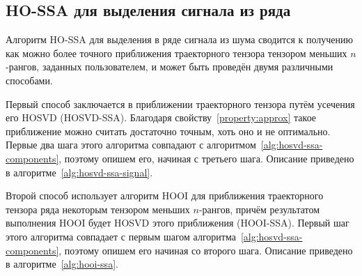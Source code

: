 \documentclass[specialist,
    substylefile = spbu.rtx,
    subf,href,colorlinks=true, 12pt]{disser}
\theoremstyle{plain}
\theoremstyle{definition}
\theoremstyle{remark}
\begin{document}
    \subsection{HO-SSA для выделения сигнала из ряда}\label{subsec:ho-ssa-signal}
    Алгоритм HO-SSA для выделения в ряде сигнала из шума сводится к получению
    как можно более точного приближения траекторного тензора тензором меньших $n$-рангов, заданных пользователем, и
    может быть проведён двумя различными способами.

    Первый способ заключается в приближении траекторного тензора путём усечения его HOSVD (HOSVD-SSA).
    Благодаря свойству~\ref{property:approx} такое приближение можно считать достаточно точным,
    хоть оно и не оптимально.
    Первые два шага этого алгоритма совпадают с алгоритмом~\ref{alg:hosvd-ssa-components}, поэтому опишем его, начиная с третьего шага.
    Описание приведено в алгоритме~\ref{alg:hosvd-ssa-signal}.

    Второй способ использует алгоритм HOOI для приближения траекторного тензора ряда некоторым тензором
    меньших $n$-рангов, причём результатом выполнения HOOI будет HOSVD этого приближения (HOOI-SSA).
    Первый шаг этого алгоритма совпадает с первым шагом алгоритма~\ref{alg:hosvd-ssa-components},
    поэтому опишем его начиная со второго шага.
    Описание приведено в алгоритме~\ref{alg:hooi-ssa}.
\end{document}

